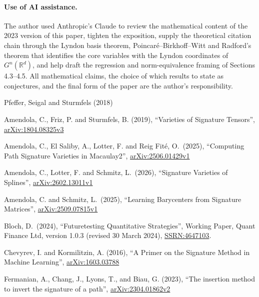 \documentclass[11pt,english]{article}
\begin{document}
\paragraph{Use of AI assistance.}
The author used Anthropic's Claude to review the mathematical content
of the 2023 version of this paper, tighten the exposition, supply
the theoretical citation chain through the Lyndon basis theorem,
Poincaré--Birkhoff--Witt and Radford's theorem that identifies the
core variables with the Lyndon coordinates of $G^{n}(\mathbb{R}^{d})$,
and help draft the regression and norm-equivalence framing of Sections
4.3--4.5. All mathematical claims, the choice of which results to
state as conjectures, and the final form of the paper are the author's
responsibility.

\begin{thebibliography}{Pfeffer, Seigal and Sturmfels (2018)}

Amendola, C.,
Friz, P. and Sturmfels, B. (2019), ``Varieties of Signature Tensors'',
\href{https://arxiv.org/abs/1804.08325v3}{arXiv:1804.08325v3}

Amendola, C., El Saliby, A.,
Lotter, F. and Reig Fité, O.\ (2025), ``Computing Path Signature Varieties
in Macaulay2'',
\href{https://arxiv.org/abs/2506.01429v1}{arXiv:2506.01429v1}

Amendola, C.,
Lotter, F. and Schmitz, L.\ (2026), ``Signature Varieties of Splines'',
\href{https://arxiv.org/abs/2602.13011v1}{arXiv:2602.13011v1}

Amendola, C. and
Schmitz, L.\ (2025), ``Learning Barycenters from Signature Matrices'',
\href{https://arxiv.org/abs/2509.07815v1}{arXiv:2509.07815v1}

Bloch, D.\ (2024),
``Futuretesting Quantitative Strategies'', Working Paper, Quant
Finance Ltd, version 1.0.3 (revised 30 March 2024),
\href{https://papers.ssrn.com/sol3/papers.cfm?abstract_id=4647103}{SSRN:4647103}.

Chevyrev, I. and Kormilitzin, A.
(2016), ``A Primer on the Signature Method in Machine Learning'',
\href{https://arxiv.org/abs/1603.03788}{arXiv:1603.03788}

Fermanian, A., Chang, J.,
Lyons, T., and Biau, G. (2023), ``The insertion method to invert the
signature of a path'', \href{https://arxiv.org/abs/2304.01862v2}{arXiv:2304.01862v2}


\end{thebibliography}
\end{document}
